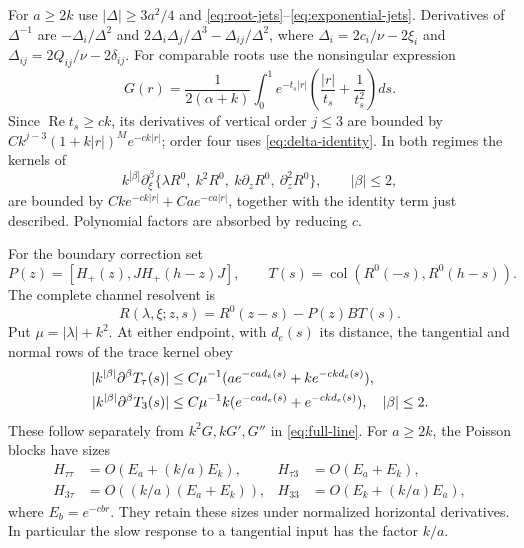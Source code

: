 \documentclass[11pt]{article}
\numberwithin{equation}{section}
\theoremstyle{remark}
\DeclareMathOperator{\Rea}{Re}
\begin{document}
For $a\geq2k$ use $|\Delta|\geq3a^2/4$ and
\eqref{eq:root-jets}--\eqref{eq:exponential-jets}. Derivatives of
$\Delta^{-1}$ are
$-\Delta_i/\Delta^2$ and
$2\Delta_i\Delta_j/\Delta^3-\Delta_{ij}/\Delta^2$, where
$\Delta_i=2c_i/\nu-2\xi_i$ and
$\Delta_{ij}=2Q_{ij}/\nu-2\delta_{ij}$.
For comparable roots use the nonsingular expression
\[
 G(r)=\frac1{2(\alpha+k)}\int_0^1
 e^{-t_s|r|}\left(\frac{|r|}{t_s}+\frac1{t_s^2}\right)ds.
\]
Since $\Rea t_s\geq ck$, its derivatives of vertical order $j\leq3$
are bounded by $Ck^{j-3}(1+k|r|)^M e^{-ck|r|}$; order four uses
\eqref{eq:delta-identity}. In both regimes the kernels of
\begin{equation}\label{eq:four-families}
 k^{|\beta|}\partial_\xi^\beta
 \{\lambda R^0,\ k^2R^0,\ k\partial_zR^0,\ \partial_z^2R^0\},
 \qquad |\beta|\leq2,
\end{equation}
are bounded by $Cke^{-ck|r|}+Cae^{-ca|r|}$, together with the
identity term just described. Polynomial factors are absorbed by reducing $c$.

For the boundary correction set
\[
 P(z)=[H_+(z),JH_+(h-z)J],\qquad
 T(s)=\operatorname{col}(R^0(-s),R^0(h-s)).
\]
The complete channel resolvent is
\begin{equation}\label{eq:channel-resolvent}
 R(\lambda,\xi;z,s)=R^0(z-s)-P(z)BT(s).
\end{equation}
Put $\mu=|\lambda|+k^2$. At either endpoint, with $d_e(s)$ its distance,
the tangential and normal rows of the trace kernel obey
\begin{align}\label{eq:trace-rows}
 |k^{|\beta|}\partial^\beta T_\tau(s)|
 &\leq C\mu^{-1}(ae^{-ca d_e(s)}+ke^{-ckd_e(s)}),\\
 |k^{|\beta|}\partial^\beta T_3(s)|
 &\leq C\mu^{-1}k(e^{-ca d_e(s)}+e^{-ckd_e(s)}),\quad |\beta|\leq2.
 \notag
\end{align}
These follow separately from $k^2G,kG',G''$ in \eqref{eq:full-line}.
For $a\geq2k$, the Poisson blocks have sizes
\begin{equation}\label{eq:poisson-sizes}
 \begin{aligned}
 H_{\tau\tau}&=O(E_a+(k/a)E_k),& H_{\tau3}&=O(E_a+E_k),\\
 H_{3\tau}&=O((k/a)(E_a+E_k)),& H_{33}&=O(E_k+(k/a)E_a),
 \end{aligned}
\end{equation}
where $E_b=e^{-cb r}$. They retain these sizes under normalized
horizontal derivatives. In particular the slow response to a tangential
input has the factor $k/a$.
\end{document}
